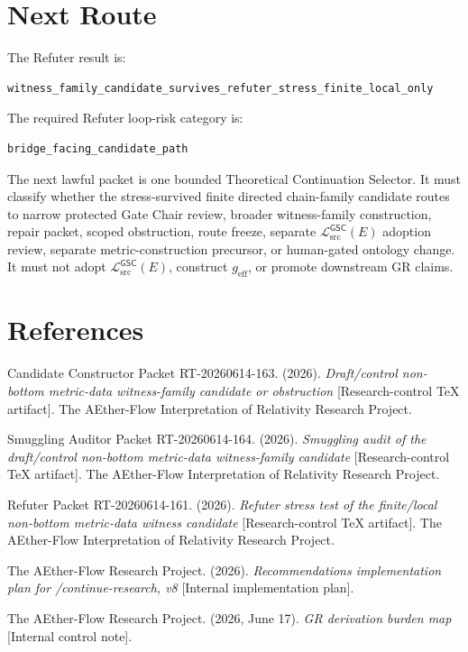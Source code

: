 \documentclass[11pt]{article}
\newcommand{\MetricData}{\mathcal{L}_{\mathrm{src}}^{\mathsf{GSC}}}
\newcommand{\geff}{g_{\mathrm{eff}}}
\begin{document}
\section{Next Route}

The Refuter result is:

\begin{verbatim}
witness_family_candidate_survives_refuter_stress_finite_local_only
\end{verbatim}

The required Refuter loop-risk category is:

\begin{verbatim}
bridge_facing_candidate_path
\end{verbatim}

The next lawful packet is one bounded Theoretical Continuation Selector. It
must classify whether the stress-survived finite directed chain-family
candidate routes to narrow protected Gate Chair review, broader witness-family
construction, repair packet, scoped obstruction, route freeze, separate
\(\MetricData(E)\) adoption review, separate metric-construction precursor,
or human-gated ontology change. It must not adopt \(\MetricData(E)\),
construct \(\geff\), or promote downstream GR claims.

\section*{References}

Candidate Constructor Packet RT-20260614-163. (2026). \textit{Draft/control
non-bottom metric-data witness-family candidate or obstruction}
[Research-control TeX artifact]. The AEther-Flow Interpretation of
Relativity Research Project.

Smuggling Auditor Packet RT-20260614-164. (2026). \textit{Smuggling audit of
the draft/control non-bottom metric-data witness-family candidate}
[Research-control TeX artifact]. The AEther-Flow Interpretation of
Relativity Research Project.

Refuter Packet RT-20260614-161. (2026). \textit{Refuter stress test of the
finite/local non-bottom metric-data witness candidate} [Research-control TeX
artifact]. The AEther-Flow Interpretation of Relativity Research Project.

The AEther-Flow Research Project. (2026). \textit{Recommendations
implementation plan for /continue-research, v8} [Internal implementation
plan].

The AEther-Flow Research Project. (2026, June 17). \textit{GR derivation
burden map} [Internal control note].
\end{document}

